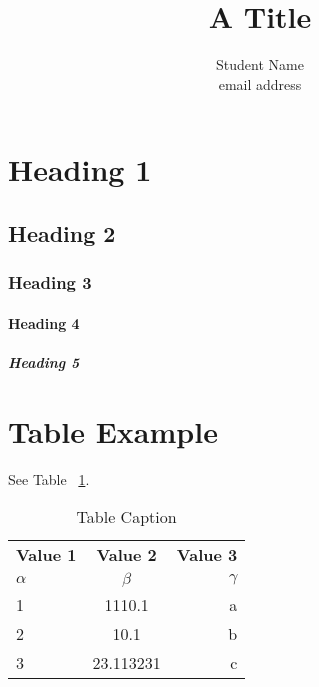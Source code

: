 \documentclass{jdf}
\begin{document}
\title{A Title}
\author{Student Name \\ email address}

\maketitle
\thispagestyle{fancy}

\begin{abstract}
\lipsum[2]
\end{abstract}

\section*{Heading 1}
\lipsum[1]

\subsection*{Heading 2}
\lipsum[2]

\subsubsection*{Heading 3}
\lipsum[3]

\paragraph*{Heading 4}
\lipsum[4]

\subparagraph*{Heading 5}
\lipsum[5]

\lipsum[6]

\section*{Table Example}
\lipsum[1] See Table ~\ref{table:1}.
\begin{table}[H]
  \begin{center}
    \caption{Table Caption}
    \label{table:1}
    \begin{tabular}{l|c|r}
      \textbf{Value 1} & \textbf{Value 2} & \textbf{Value 3}\\
      $\alpha$ & $\beta$ & $\gamma$ \\
      \hline
      1 & 1110.1 & a\\
      2 & 10.1 & b\\
      3 & 23.113231 & c\\
    \end{tabular}
  \end{center}
\end{table}
\end{document}
